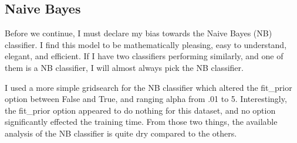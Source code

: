 \documentclass[12pt]{article}
\begin{document}
\subsection{Naive Bayes}
Before we continue, I must declare my bias towards the Naive Bayes (NB) classifier. I find this model to be mathematically
pleasing, easy to understand, elegant, and efficient. If I have two classifiers performing similarly, and one of them is a NB 
classifier, I will almost always pick the NB classifier. 

I used a more simple gridsearch for the NB classifier which altered the fit\_prior option between False and True, and 
ranging alpha from .01 to 5. Interestingly, the fit\_prior option appeared to do nothing for this dataset, and no option
significantly effected the training time. From those two things, the available analysis of the NB classifier is quite 
dry compared to the others.
\end{document}
